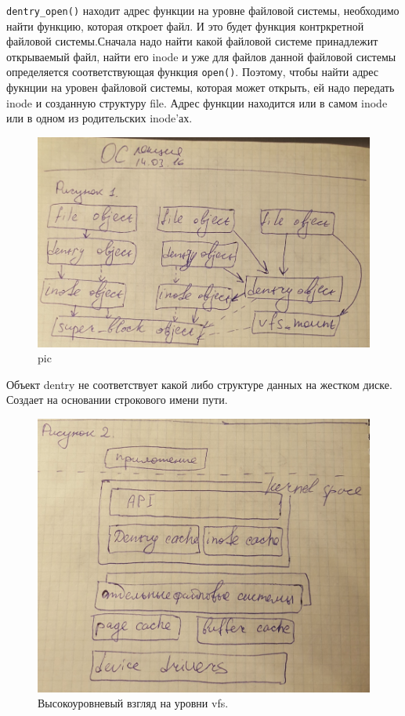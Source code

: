  

\verb|dentry_open()| находит адрес функции на уровне файловой системы, необходимо найти функцию, которая откроет файл. И это будет функция контркретной файловой системы.Сначала надо найти какой файловой системе принадлежит открываемый файл, найти его inode и уже для файлов данной файловой системы определяется соответствующая функция \verb|open()|. Поэтому, чтобы найти адрес фукнции на уровен файловой системы, которая может открыть, ей надо передать inode и созданную структуру file. 
Адрес функции находится или в самом inode или в одном из родительских inode'ах.

\begin{figure}[H]
  \centering
  \includegraphics[width=\textwidth]{pic/1.png}
  \caption{pic}
\end{figure}

 

Объект dentry не соответствует какой либо структуре данных на жестком диске. Создает на основании строкового имени пути.

\begin{figure}[H]
  \centering
  \includegraphics[width=\textwidth]{pic/2.png}
  \caption{Высокоуровневый взгляд на уровни vfs.}
\end{figure}

